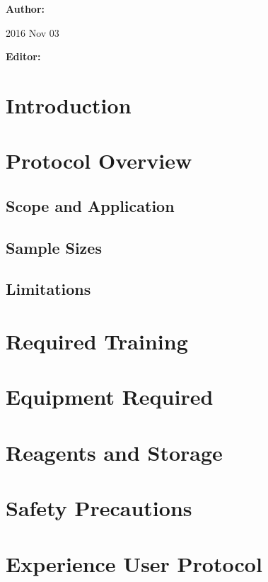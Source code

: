 


\textbf{Author:} \author{M. Larsen}{2016 Nov 03}

\textbf{Editor:} 


\contact{}

\clearpage
\tableofcontents
\clearpage

\section{Introduction}

\section{Protocol Overview}
\subsection{Scope and Application}
\subsection{Sample Sizes}
\subsection{Limitations}

\section{Required Training}

\section{Equipment Required}

\section{Reagents and Storage}

\section{Safety Precautions}

\section{Experience User Protocol}
